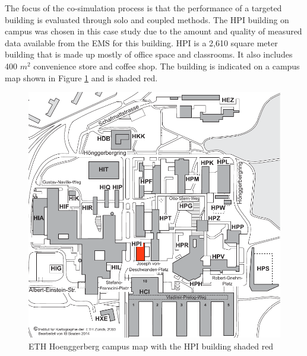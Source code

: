 \documentclass{tBPS2e}
\theoremstyle{plain}
\theoremstyle{definition}
\theoremstyle{remark}
\begin{document}


The focus of the co-simulation process is that the performance of a targeted
building is evaluated through solo and coupled methods. The HPI building on
campus was chosen in this case study due to the amount and quality of measured
data available from the EMS for this building. HPI is a 2,610 square meter
building that is made up mostly of office space and classrooms. It also
includes 400 $m^2$ convenience store and coffee shop. The building is
indicated on a campus map shown in Figure \ref{fig:campusmap} and is shaded
red.


\begin{figure}[H]
\centering
\includegraphics[scale=0.5]{figures/ETH_Hoenngerbergcamp_targetedbuildings_HPI}
\caption{ETH Hoenggerberg campus map with the HPI building shaded red}
\label{fig:campusmap}
\end{figure}
\end{document}
